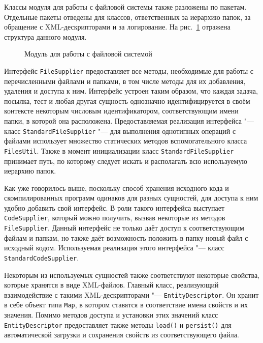 Классы модуля для работы с файловой системы также разложены по пакетам. Отдельные пакеты отведены для классов, ответственных за иерархию папок, за обращение с XML-дескрипторами и за логирование. На рис.~\ref{package_diagram_file_system} отражена структура данного модуля.

\begin{figure}[h]
\caption{Модуль для работы с файловой системой}
\label{package_diagram_file_system}
\end{figure}

Интерфейс \texttt{File\-Supplier} предоставляет все методы, необходимые для работы с перечисленными файлами и папками, в том числе методы для их добавления, удаления и доступа к ним. Интерфейс устроен таким образом, что каждая задача, посылка, тест и любая другая сущность однозначно идентифицируется в своём контексте некоторым числовым идентификатором, соответствующим имени папки, в которой она расположена. Предоставляемая реализация интерфейса "--- класс \texttt{Standard\-File\-Supplier} "--- для выполнения однотипных операций с файлами использует множество статических методов вспомогательного класса \texttt{Files\-Util}. Также в момент инициализации класс \texttt{Standard\-File\-Supplier} принимает путь, по которому следует искать и располагать всю используемую иерархию папок.

Как уже говорилось выше, поскольку способ хранения исходного кода и скомпилированных программ одинаков для разных сущностей, для доступа к ним удобно добавить свой интерфейс. В роли такого интерфейса выступает \texttt{Code\-Supplier}, который можно получить, вызвав некоторые из методов \texttt{File\-Supplier}. Данный интерфейс не только даёт доступ к соответствующим файлам и папкам, но также даёт возможность положить в папку новый файл с исходный кодом. Используемая реализация этого интерфейса "--- класс \texttt{Standard\-Code\-Supplier}.

Некоторым из используемых сущностей также соответствуют некоторые свойства, которые хранятся в виде XML-файлов. Главный класс, реализующий взаимодействие с такими XML-дескрипторами "--- \texttt{Entity\-Descriptor}. Он хранит в себе объект типа \texttt{Map}, в котором ставятся в соответствие имена свойств и их значения. Помимо методов доступа и установки этих значений класс \texttt{Entity\-Descriptor} предоставляет также методы \texttt{load()} и \texttt{persist()} для автоматической загрузки и сохранения свойств из соответствующего файла.

